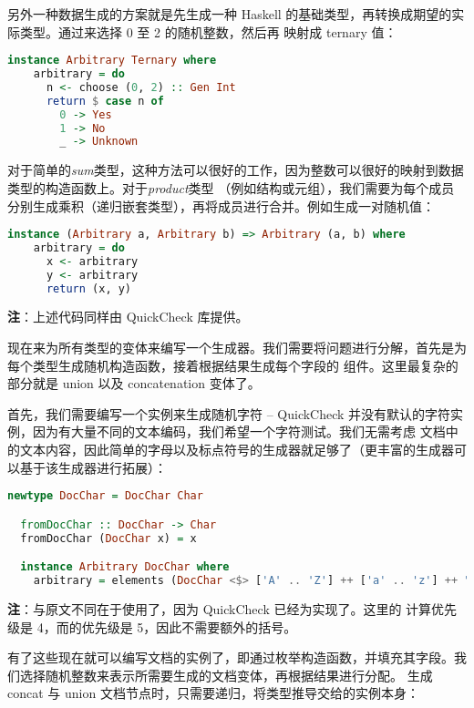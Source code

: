 \documentclass[./main.tex]{subfiles}
\begin{document}
另外一种数据生成的方案就是先生成一种 Haskell 的基础类型，再转换成期望的实际类型。通过来选择 0 至 2 的随机整数，然后再
映射成 ternary 值：

\begin{lstlisting}[language=Haskell]
  instance Arbitrary Ternary where
    arbitrary = do
      n <- choose (0, 2) :: Gen Int
      return $ case n of
        0 -> Yes
        1 -> No
        _ -> Unknown
\end{lstlisting}

对于简单的\textit{sum}类型，这种方法可以很好的工作，因为整数可以很好的映射到数据类型的构造函数上。对于\textit{product}类型
（例如结构或元组），我们需要为每个成员分别生成乘积（递归嵌套类型），再将成员进行合并。例如生成一对随机值：

\begin{lstlisting}[language=Haskell]
  instance (Arbitrary a, Arbitrary b) => Arbitrary (a, b) where
    arbitrary = do
      x <- arbitrary
      y <- arbitrary
      return (x, y)
\end{lstlisting}

\textbf{注}：上述代码同样由 QuickCheck 库提供。

现在来为所有类型的变体来编写一个生成器。我们需要将问题进行分解，首先是为每个类型生成随机构造函数，接着根据结果生成每个字段的
组件。这里最复杂的部分就是 union 以及 concatenation 变体了。

首先，我们需要编写一个实例来生成随机字符 -- QuickCheck 并没有默认的字符实例，因为有大量不同的文本编码，我们希望一个字符测试。我们无需考虑
文档中的文本内容，因此简单的字母以及标点符号的生成器就足够了（更丰富的生成器可以基于该生成器进行拓展）：

\begin{lstlisting}[language=Haskell]
  newtype DocChar = DocChar Char

  fromDocChar :: DocChar -> Char
  fromDocChar (DocChar x) = x

  instance Arbitrary DocChar where
    arbitrary = elements (DocChar <$> ['A' .. 'Z'] ++ ['a' .. 'z'] ++ " ~!@#$%^&*()")
\end{lstlisting}

\textbf{注}：与原文不同在于使用了，因为 QuickCheck 已经为实现了。这里\acode{(<\$>)}的
计算优先级是 4，而\acode{(++)}的优先级是 5，因此不需要额外的括号。

有了这些现在就可以编写文档的实例了，即通过枚举构造函数，并填充其字段。我们选择随机整数来表示所需要生成的文档变体，再根据结果进行分配。
生成 concat 与 union 文档节点时，只需要递归，将类型推导交给的实例本身：
\end{document}
